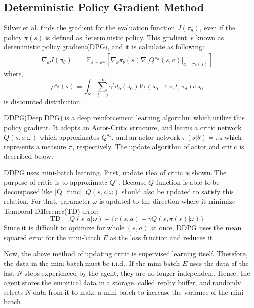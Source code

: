 \documentclass[english, dvipdfmx]{ampmt}             %
\newcommand{\expect}{\mathbb{E}}
\begin{document}
\subsection{Deterministic Policy Gradient Method}
Silver et al.\cite{DPG} finds the gradient for the evaluation function $J(\pi_{\theta})$, even if the policy $\pi(s)$ is defined as deterministic policy. This gradient is known as deteministic policy gradient(DPG), and it is calculate as following:
\begin{align}
	\nabla_{\theta}J(\pi_{\theta}) &= \expect_{s\sim\rho^{\pi_{\theta}}}[
	\nabla_{\theta}\pi_{\theta}(s)\nabla_{a}Q^{\pi_{\theta}}(s, a)|_{a=\pi_{\theta}(s)}] \label{true_pg} 
\end{align}
where, 
\begin{equation}
	\rho^{\pi_{\theta}}(s) = \int_{S}\sum_{t=0}^{\infty}\gamma^td_0(s_0)\textrm{Pr}(s_0\to s, t,  \pi_{\theta})\textrm{d}s_0
\end{equation}
is discounted distribution.\par
DDPG(Deep DPG) is a deep reinforcement learning algorithm which utilize this policy gradient. It adopts an Actor-Critic structure, and learns a critic network $Q(s,a|\omega)$ which approximates $Q^{\pi_{\theta}}$, and an actor network $\pi(s|\theta)=\pi_{\theta}$ which represents a measure $\pi$, respectively. The update algorithm of actor and critic is described below.\par
DDPG uses mini-batch learning. First, update idea of critic is shown. The purpose of critic is to approximate $Q^{\pi}$. Because $Q$ function is able to be decomposed like \eqref{Q_func}, $Q(s,a|\omega)$ should also be updated to satisfy this relation. For that, parameter $\omega$ is updated to the direction where it minimize Temporal Difference(TD) error: 
\begin{equation}
	\textrm{TD} = Q(s,a|\omega) - \{r(s,a)+\gamma Q(s,\pi(s)|\omega)\}
\end{equation}
Since it is difficult to optimize for whole $(s,a)$ at once, DDPG uses the mean squared error for the mini-batch $E$ as the loss function and reduces it. \par
Now, the above method of updating critic is supervised learning itself. Therefore, the data in the mini-batch must be i.i.d.. If the mini-batch $E$ uses the data of the last $N$ steps experienced by the agent, they are no longer independent. Hence, the agent stores the empirical data in a storage, called replay buffer, and randomly selects $N$ data from it to make a mini-batch to increase the variance of the mini-batch.\par
\end{document}
